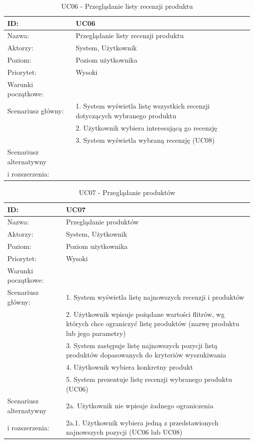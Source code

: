 \begin{table}[H]
    \begin{tabular}{|p{5cm}|p{9cm}|}\hline
    ID: & UC06 \\\hline
    Nazwa: & Przeglądanie listy recenzji produktu \\\hline
    Aktorzy: & System, Użytkownik \\\hline
    Poziom: & Poziom użytkownika  \\\hline
    Priorytet: & Wysoki \\\hline
    Warunki początkowe: & ~ \\\hline
    Scenariusz główny: & 1. System wyświetla listę wszystkich recenzji dotyczących wybranego produktu \\
    ~ & 2. Użytkownik wybiera interesującą go recenzję \\
    ~ & 3. System wyświetla wybraną recenzję (UC08) \\\hline
    Scenariusz alternatywny & ~ \\
	i rozszerzenia: & ~ \\
    \hline\end{tabular}
	\caption{UC06 - Przeglądanie listy recenzji produktu}
\end{table}
\newpage
\begin{table}[H]
    \begin{tabular}{|p{5cm}|p{9cm}|}\hline
    ID: & UC07 \\\hline
    Nazwa: & Przeglądanie produktów \\\hline
    Aktorzy: & System, Użytkownik \\\hline
    Poziom: & Poziom użytkownika  \\\hline
    Priorytet: & Wysoki \\\hline
    Warunki początkowe: & ~ \\\hline
    Scenariusz główny: & 1. System wyświetla listę najnowszych recenzji i produktów \\
    ~ & 2. Użytkownik wpisuje pożądane wartości flitrów, wg których chce ograniczyć listę produktów (nazwę produktu lub jego parametry) \\
    ~ & 3. System zastępuje listę najnowszych pozycji listą produktów dopasowanych do kryteriów wyszukiwania \\
    ~ & 4. Użytkownik wybiera konkretny produkt \\
    ~ & 5. System prezentuje listę recenzji wybranego produktu (UC06) \\\hline
    Scenariusz alternatywny & 2a. Użytkownik nie wpisuje żadnego ograniczenia \\
    i rozszerzenia: & 2a.1. Użytkownik wybiera jedną z przedstawionych najnowszych pozycji (UC06 lub UC08) \\
	\hline\end{tabular}
	\caption{UC07 - Przeglądanie produktów}
\end{table}

